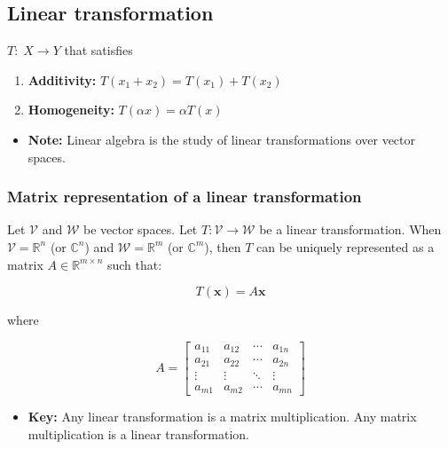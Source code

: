 \subsection{Linear transformation}
\begin{definition} 
    $T: \; X\rightarrow Y$ that satisfies
    \begin{enumerate}
        \item \textbf{Additivity:} $T(x_1 + x_2) = T(x_1) + T(x_2)$ 
        \item \textbf{Homogeneity:} $T(\alpha x) = \alpha T(x)$
    \end{enumerate}
    \begin{itemize}
        \item \textbf{Note:} Linear algebra is the study of linear transformations over vector spaces.
    \end{itemize}
\end{definition}

\subsubsection{Matrix representation of a linear transformation}
\begin{definition}
    Let \( \mathcal{V} \) and \( \mathcal{W} \) be vector spaces. Let \( T: \mathcal{V} \to \mathcal{W} \) be a linear transformation. When \( \mathcal{V} = \mathbb{R}^n \) (or \( \mathbb{C}^n \)) and \( \mathcal{W} = \mathbb{R}^m \) (or \( \mathbb{C}^m \)), then \( T \) can be uniquely represented as a matrix \( A \in \mathbb{R}^{m \times n} \) such that:

    \[
    T(\mathbf{x}) = A \mathbf{x}
    \]

    where

    \[
    A = \begin{bmatrix}
    a_{11} & a_{12} & \cdots & a_{1n} \\
    a_{21} & a_{22} & \cdots & a_{2n} \\
    \vdots & \vdots & \ddots & \vdots \\
    a_{m1} & a_{m2} & \cdots & a_{mn}
    \end{bmatrix}
    \]
    \begin{itemize}
        \item \textbf{Key:} Any linear transformation is a matrix multiplication. Any matrix multiplication is a linear transformation.
    \end{itemize}
\end{definition}

